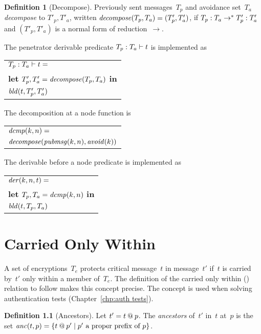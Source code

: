 \documentclass[12pt]{report}
\theoremstyle{definition}
\newtheorem{defn}{Definition}[chapter]
\newcommand{\pubmsg}{\fn{pubmsg}}
\newcommand{\avoid}{\fn{avoid}}
\begin{document}
\begin{defn}[Decompose]\label{def:decompose}
Previously sent messages~$T_p$ and avoidance set~$T_a$
\emph{decompose} to $T'_p,T'_a$, written
$\fn{decompose}(T_p,T_a)=(T'_p,T'_a)$, if
$\dctx{T_p}{T_a}\to^\ast\dctx{T'_p}{T'_a}$
and $(T'_p,T'_a)$ is a normal form of reduction~$\to$.
\end{defn}

The penetrator derivable predicate $\der{t}{T_p}{T_a}$ is implemented as
\begin{center}
\begin{tabular}{l}
$\der{t}{T_p}{T_a}={}$\\
\quad\textbf{let} $T'_p, T'_a=\fn{decompose}(T_p,T_a)$ \textbf{in}\\
\quad$\fn{bld}(t,T'_p,T'_a)$
\end{tabular}
\end{center}

The decomposition at a node function is
\begin{center}
\begin{tabular}{l}
$\fn{dcmp}(k,n)={}$\\
\quad$\fn{decompose}(\pubmsg(k,n),\avoid(k))$
\end{tabular}
\end{center}

The derivable before a node predicate is implemented as
\begin{center}
\begin{tabular}{l}
$\fn{der}(k,n,t)={}$\\
\quad\textbf{let} $T_p, T_a=\fn{dcmp}(k,n)$ \textbf{in}\\
\quad$\fn{bld}(t,T_p,T_a)$
\end{tabular}
\end{center}

\chapter{Carried Only Within}\label{chp:cow}

A set of encryptions~$T_e$ protects critical message~$t$ in
message~$t'$ if~$t$ is carried by~$t'$ only within a member of~$T_e$.
The definition of the carried only within ({\cow}) relation to follow makes
this concept precise.  The concept is used when solving authentication
tests (Chapter~\ref{chp:auth tests}).

\begin{defn}[Ancestors]
Let $t'=t\termat p$.  The \emph{ancestors} of~$t'$
in~$t$ at~$p$ is the set $\fn{anc}(t,p)=\{t\termat p'\mid \mbox{$p'$ a
  proper prefix of~$p$}\}$.
\end{defn}
\end{document}
